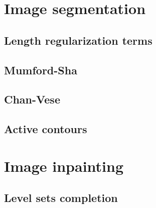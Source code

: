 \section{Image segmentation}
\subsection{Length regularization terms}
\subsection{Mumford-Sha}
\subsection{Chan-Vese}
\subsection{Active contours}

\section{Image inpainting}
\subsection{Level sets completion}



%
%
%
